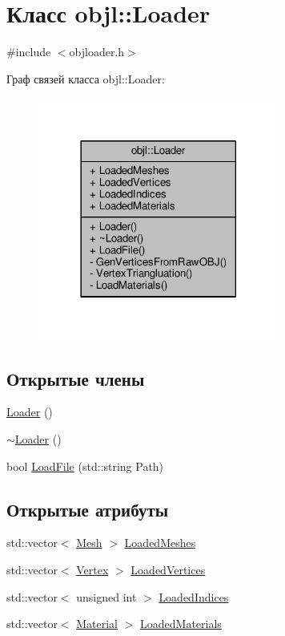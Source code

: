\hypertarget{classobjl_1_1_loader}{}\section{Класс objl\+:\+:Loader}
\label{classobjl_1_1_loader}


{\ttfamily \#include $<$objloader.\+h$>$}



Граф связей класса objl\+:\+:Loader\+:
\nopagebreak
\begin{figure}[H]
\begin{center}
\leavevmode
\includegraphics[width=225pt]{dd/d07/classobjl_1_1_loader__coll__graph}
\end{center}
\end{figure}
\subsection*{Открытые члены}
\begin{DoxyCompactItemize}
\item 
\hyperlink{classobjl_1_1_loader_a8ae8d4592c0f727daca80005ae48ea32}{Loader} ()
\item 
\hyperlink{classobjl_1_1_loader_a40d6e6ce91ce09df26a4042605ef4c4c}{$\sim$\+Loader} ()
\item 
bool \hyperlink{classobjl_1_1_loader_a4e3c689962e3ac018d5944f37a791518}{Load\+File} (std\+::string Path)
\end{DoxyCompactItemize}
\subsection*{Открытые атрибуты}
\begin{DoxyCompactItemize}
\item 
std\+::vector$<$ \hyperlink{structobjl_1_1_mesh}{Mesh} $>$ \hyperlink{classobjl_1_1_loader_aba5e73cc2c1d0a917415498723ea5702}{Loaded\+Meshes}
\item 
std\+::vector$<$ \hyperlink{structobjl_1_1_vertex}{Vertex} $>$ \hyperlink{classobjl_1_1_loader_ada15ad9ce70b5c457907be7988436ed5}{Loaded\+Vertices}
\item 
std\+::vector$<$ unsigned int $>$ \hyperlink{classobjl_1_1_loader_a29e18c5a09e82ac44106e282d1acf31a}{Loaded\+Indices}
\item 
std\+::vector$<$ \hyperlink{structobjl_1_1_material}{Material} $>$ \hyperlink{classobjl_1_1_loader_a302204a43746c96f7fe0c72516019f9f}{Loaded\+Materials}
\end{DoxyCompactItemize}
